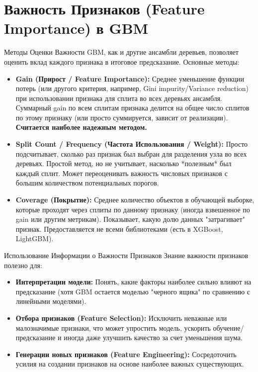 \section{Важность Признаков (Feature Importance) в GBM}

\begin{myexampleblock}{Методы Оценки Важности}
    GBM, как и другие ансамбли деревьев, позволяет оценить вклад каждого признака в итоговое предсказание. Основные методы:
    \begin{itemize}[nosep, leftmargin=*]
        \item \textbf{Gain (Прирост / Feature Importance):} Среднее уменьшение функции потерь (или другого критерия, например, Gini impurity/Variance reduction) при использовании признака для сплита во всех деревьях ансамбля. Суммарный gain по всем сплитам признака делится на общее число сплитов по этому признаку (или просто суммируется, зависит от реализации). \textbf{Считается наиболее надежным методом.}
        \item \textbf{Split Count / Frequency (Частота Использования / Weight):} Просто подсчитывает, сколько раз признак был выбран для разделения узла во всех деревьях. Простой метод, но не учитывает, насколько *полезным* был каждый сплит. Может переоценивать важность числовых признаков с большим количеством потенциальных порогов.
        \item \textbf{Coverage (Покрытие):} Среднее количество объектов в обучающей выборке, которые проходят через сплиты по данному признаку (иногда взвешенное по gain или другим метрикам). Показывает, какую долю данных "затрагивает" признак. Предоставляется не всеми библиотеками (есть в XGBoost, LightGBM).
    \end{itemize}
\end{myexampleblock}

\begin{textbox}{Использование Информации о Важности Признаков}
    Знание важности признаков полезно для:
    \begin{itemize}[nosep, leftmargin=*]
        \item \textbf{Интерпретации модели:} Понять, какие факторы наиболее сильно влияют на предсказание (хотя GBM остается моделью "черного ящика" по сравнению с линейными моделями).
        \item \textbf{Отбора признаков (Feature Selection):} Исключить неважные или малозначимые признаки, что может упростить модель, ускорить обучение/предсказание и иногда даже улучшить качество за счет уменьшения шума.
        \item \textbf{Генерации новых признаков (Feature Engineering):} Сосредоточить усилия на создании признаков на основе наиболее важных существующих.
    \end{itemize}
\end{textbox}

